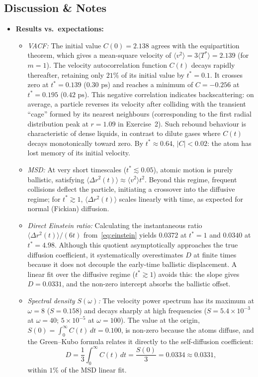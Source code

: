 \documentclass[11pt,a4paper]{article}
\begin{document}
\subsection{Discussion \& Notes}
\begin{itemize}
  \item \textbf{Results vs.\ expectations:}
  \begin{itemize}
    \item \emph{VACF:} The initial value $C(0) = 2.138$ agrees with the equipartition theorem, which gives a mean-square velocity of $\langle v^2\rangle = 3\langle T^*\rangle = 2.139$ (for $m = 1$). The velocity autocorrelation function $C(t)$ decays rapidly thereafter, retaining only $21\%$ of its initial value by $t^* = 0.1$. It crosses zero at $t^* = 0.139$ ($0.30\text{ ps}$) and reaches a minimum of $C = -0.256$ at $t^* = 0.195$ ($0.42\text{ ps}$). This negative correlation indicates backscattering: on average, a particle reverses its velocity after colliding with the transient ``cage'' formed by its nearest neighbours (corresponding to the first radial distribution peak at $r = 1.09$ in Exercise~2). Such rebound behaviour is characteristic of dense liquids, in contrast to dilute gases where $C(t)$ decays monotonically toward zero. By $t^* \approx 0.64$, $|C| < 0.02$: the atom has lost memory of its initial velocity.

    \item \emph{MSD:} At very short timescales ($t^* \lesssim 0.05$), atomic motion is purely ballistic, satisfying $\langle \Delta r^2(t)\rangle \approx \langle v^2\rangle t^2$. Beyond this regime, frequent collisions deflect the particle, initiating a crossover into the diffusive regime; for $t^* \gtrsim 1$, $\langle \Delta r^2(t)\rangle$ scales linearly with time, as expected for normal (Fickian) diffusion.

    \item \emph{Direct Einstein ratio:} Calculating the instantaneous ratio $\langle \Delta r^2(t)\rangle / (6t)$ from~\eqref{eq:einstein} yields $0.0372$ at $t^* = 1$ and $0.0340$ at $t^* = 4.98$. Although this quotient asymptotically approaches the true diffusion coefficient, it systematically overestimates $D$ at finite times because it does not decouple the early-time ballistic displacement. A linear fit over the diffusive regime ($t^* \gtrsim 1$) avoids this: the slope gives $D = 0.0331$, and the non-zero intercept absorbs the ballistic offset.

    \item \emph{Spectral density $S(\omega)$:} The velocity power spectrum has its maximum at $\omega = 8$ ($S = 0.158$) and decays sharply at high frequencies ($S = 5.4 \times 10^{-3}$ at $\omega = 40$; $5 \times 10^{-5}$ at $\omega = 100$). The value at the origin, $S(0) = \int_0^\infty C(t)\,dt = 0.100$, is non-zero because the atoms diffuse, and the Green--Kubo formula relates it directly to the self-diffusion coefficient:
    \begin{equation}
      D = \frac{1}{3}\int_0^\infty C(t)\,dt = \frac{S(0)}{3} = 0.0334 \approx 0.0331,
    \end{equation}
    within $1\%$ of the MSD linear fit.
  \end{itemize}


\end{itemize}
\end{document}
